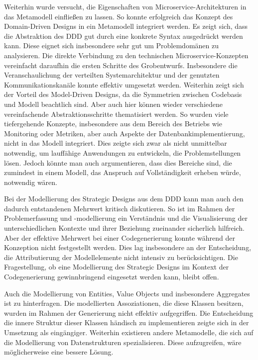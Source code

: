 Weiterhin wurde versucht, die Eigenschaften von Microservice-Architekturen in das Metamodell einfließen zu lassen. So konnte erfolgreich das Konzept des Domain-Driven Designs in ein Metamodell integriert werden. Es zeigt sich, dass die Abstraktion des DDD gut durch eine konkrete Syntax ausgedrückt werden kann. Diese eignet sich insbesondere sehr gut um Problemdomänen zu analysieren. Die direkte Verbindung zu den technischen Microservice-Konzepten vereinfacht daraufhin die ersten Schritte des Grobentwurfs. Insbesondere die Veranschaulichung der verteilten Systemarchitektur und der genutzten Kommunikationskanäle konnte effektiv umgesetzt werden. Weiterhin zeigt sich der Vorteil des Model-Driven Designs, da die Symmetrien zwischen Codebasis und Modell beachtlich sind. Aber auch hier können wieder verschiedene vereinfachende Abstraktionsschritte thematisiert werden. So wurden viele tiefergehende Konzepte, insbesondere aus dem Bereich des Betriebs wie Monitoring oder Metriken, aber auch Aspekte der Datenbankimplementierung, nicht in das Modell integriert. Dies zeigte sich zwar als nicht unmittelbar notwendig, um lauffähige Anwendungen zu entwickeln, die Problemstellungen lösen. Jedoch könnte man auch argumentieren, dass dies Bereiche sind, die zumindest in einem Modell, das Anspruch auf Vollständigkeit erheben würde, notwendig wären.

Bei der Modellierung des Strategic Designs aus dem DDD kann man auch den dadurch entstandenen Mehrwert kritisch diskutieren. So ist im Rahmen der Problemerfassung und -modellierung ein Verständnis und die Visualisierung der unterschiedlichen Kontexte und ihrer Beziehung zueinander sicherlich hilfreich. Aber der effektive Mehrwert bei einer Codegenerierung konnte während der Konzeption nicht festgestellt werden. Dies lag insbesondere an der Entscheidung, die Attributierung der Modellelemente nicht intensiv zu berücksichtigen. Die Fragestellung, ob eine Modellierung des Strategic Designs im Kontext der Codegenerierung gewinnbringend eingesetzt werden kann, bleibt offen.

Auch die Modellierung von Entities, Value Objects und insbesondere Aggregates ist zu hinterfragen. Die modellierten Assoziationen, die diese Klassen besitzen, wurden im Rahmen der Generierung nicht effektiv aufgegriffen. Die Entscheidung die innere Struktur dieser Klassen händisch zu implementieren zeigte sich in der Umsetzung als eingängiger. Weiterhin existieren andere Metamodelle, die sich auf die Modellierung von Datenstrukturen spezialisieren. Diese aufzugreifen, wäre möglicherweise eine bessere Lösung.

